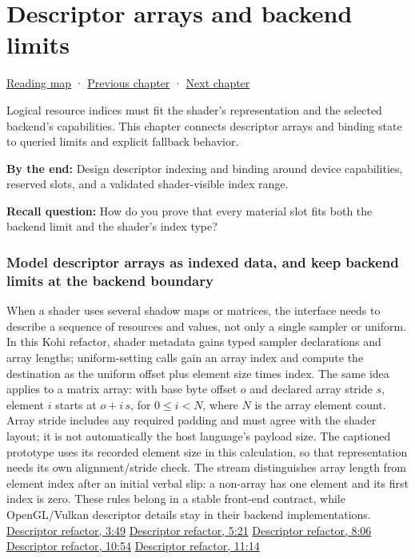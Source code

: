 \hypertarget{06-engine-ii-ch026}{}
\chapter{Descriptor arrays and backend limits}\label{stagechapter:06-engine-ii-ch026}\label{06-engine-ii-ch026-descriptor-arrays-and-backend-limits}

\hyperref[volume-reading-map]{Reading map} · \hyperref[06-engine-ii-ch025-renderer-evolution-through-resource-ownership]{Previous chapter} · \hyperref[06-engine-ii-ch027-preparing-and-publishing-runtime-content]{Next chapter}

Logical resource indices must fit the shader's representation and the selected backend's capabilities. This chapter connects descriptor arrays and binding state to queried limits and explicit fallback behavior.

\textbf{By the end:} Design descriptor indexing and binding around device capabilities, reserved slots, and a validated shader-visible index range.

\textbf{Recall question:} How do you prove that every material slot fits both the backend limit and the shader's index type?

\subsection{Model descriptor arrays as indexed data, and keep backend limits at the backend boundary}\label{06-engine-ii-ch026-model-descriptor-arrays-as-indexed-data-and-keep-backend-limits-at-the-backend-boundary}

When a shader uses several shadow maps or matrices, the interface needs to describe a sequence of resources and values, not only a single sampler or uniform. In this Kohi refactor, shader metadata gains typed sampler declarations and array lengths; uniform-setting calls gain an array index and compute the destination as the uniform offset plus element size times index. The same idea applies to a matrix array: with base byte offset \(o\) and declared array stride \(s\), element \(i\) starts at \(o+i\,s\), for \(0\leq i<N\), where \(N\) is the array element count. Array stride includes any required padding and must agree with the shader layout; it is not automatically the host language's payload size. The captioned prototype uses its recorded element size in this calculation, so that representation needs its own alignment/stride check. The stream distinguishes array length from element index after an initial verbal slip: a non-array has one element and its first index is zero. These rules belong in a stable front-end contract, while OpenGL/Vulkan descriptor details stay in their backend implementations. \href{https://www.youtube.com/watch?v=HahgZzF2Dfo&t=229s}{Descriptor refactor, 3:49} \href{https://www.youtube.com/watch?v=HahgZzF2Dfo&t=320s}{Descriptor refactor, 5:21} \href{https://www.youtube.com/watch?v=HahgZzF2Dfo&t=484s}{Descriptor refactor, 8:06} \href{https://www.youtube.com/watch?v=HahgZzF2Dfo&t=653s}{Descriptor refactor, 10:54} \href{https://www.youtube.com/watch?v=HahgZzF2Dfo&t=673s}{Descriptor refactor, 11:14}

